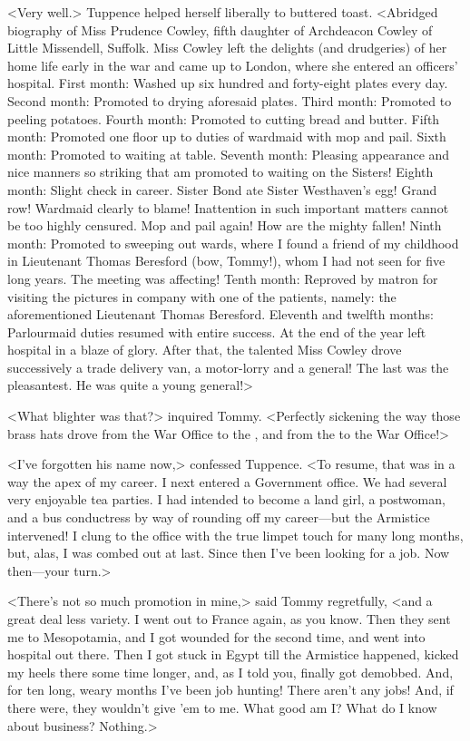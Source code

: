 <Very well.> Tuppence helped herself liberally to buttered toast. <Abridged biography of Miss Prudence Cowley, fifth daughter of Archdeacon Cowley of Little Missendell, Suffolk. Miss Cowley left the delights (and drudgeries) of her home life early in the war and came up to London, where she entered an officers' hospital. First month: Washed up six hundred and forty-eight plates every day. Second month: Promoted to drying aforesaid plates. Third month: Promoted to peeling potatoes. Fourth month: Promoted to cutting bread and butter. Fifth month: Promoted one floor up to duties of wardmaid with mop and pail. Sixth month: Promoted to waiting at table. Seventh month: Pleasing appearance and nice manners so striking that am promoted to waiting on the Sisters! Eighth month: Slight check in career. Sister Bond ate Sister Westhaven's egg! Grand row! Wardmaid clearly to blame! Inattention in such important matters cannot be too highly censured. Mop and pail again! How are the mighty fallen! Ninth month: Promoted to sweeping out wards, where I found a friend of my childhood in Lieutenant Thomas Beresford (bow, Tommy!), whom I had not seen for five long years. The meeting was affecting! Tenth month: Reproved by matron for visiting the pictures in company with one of the patients, namely: the aforementioned Lieutenant Thomas Beresford. Eleventh and twelfth months: Parlourmaid duties resumed with entire success. At the end of the year left hospital in a blaze of glory. After that, the talented Miss Cowley drove successively a trade delivery van, a motor-lorry and a general! The last was the pleasantest. He was quite a young general!>

<What blighter was that?> inquired Tommy. <Perfectly sickening the way those brass hats drove from the War Office to the , and from the  to the War Office!>

<I've forgotten his name now,> confessed Tuppence. <To resume, that was in a way the apex of my career. I next entered a Government office. We had several very enjoyable tea parties. I had intended to become a land girl, a postwoman, and a bus conductress by way of rounding off my career—but the Armistice intervened! I clung to the office with the true limpet touch for many long months, but, alas, I was combed out at last. Since then I've been looking for a job. Now then—your turn.>

<There's not so much promotion in mine,> said Tommy regretfully, <and a great deal less variety. I went out to France again, as you know. Then they sent me to Mesopotamia, and I got wounded for the second time, and went into hospital out there. Then I got stuck in Egypt till the Armistice happened, kicked my heels there some time longer, and, as I told you, finally got demobbed. And, for ten long, weary months I've been job hunting! There aren't any jobs! And, if there were, they wouldn't give 'em to me. What good am I? What do I know about business? Nothing.>

